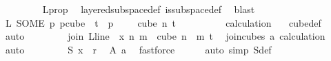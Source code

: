 \begin{isabellebody}
\ \ \ \ \ \ \ \isamarkupfalse%
\ L{\isacharunderscore}{\kern0pt}prop\ \isamarkupfalse%
\ layered{\isacharunderscore}{\kern0pt}subspace{\isacharunderscore}{\kern0pt}def\ is{\isacharunderscore}{\kern0pt}subspace{\isacharunderscore}{\kern0pt}def\ \isamarkupfalse%
\ blast\isanewline
\ \ \ \ \ \isamarkupfalse%
\ \isamarkupfalse%
\ {\isachardoublequoteopen}L\ {\isacharparenleft}{\kern0pt}SOME\ p{\isachardot}{\kern0pt}\ p{\isasymin}cube\ {}\ {\isacharparenleft}{\kern0pt}t{\isacharplus}{\kern0pt}{}{\isacharparenright}{\kern0pt}\ {\isasymand}\ p\ {}\ {\isacharequal}{\kern0pt}\ {}{\isacharparenright}{\kern0pt}\ {\isasymin}\ cube\ n\ {\isacharparenleft}{\kern0pt}t{\isacharplus}{\kern0pt}{}{\isacharparenright}{\kern0pt}{\isachardoublequoteclose}\ \isanewline
\ \ \ \ \ \ \ \isamarkupfalse%
\ calculation\ {\isacharparenleft}{\kern0pt}{}{\isacharcomma}{\kern0pt}{}{\isacharparenright}{\kern0pt}\ \isamarkupfalse%
\ cube{\isacharunderscore}{\kern0pt}def\ \isamarkupfalse%
\ auto\isanewline
\ \ \ \ \ \isamarkupfalse%
\ \isamarkupfalse%
\ {\isachardoublequoteopen}join\ {\isacharparenleft}{\kern0pt}L{\isacharunderscore}{\kern0pt}line\ {}{\isacharparenright}{\kern0pt}\ x\ n\ m\ {\isasymin}\ cube\ {\isacharparenleft}{\kern0pt}n\ {\isacharplus}{\kern0pt}\ m{\isacharparenright}{\kern0pt}\ {\isacharparenleft}{\kern0pt}t{\isacharplus}{\kern0pt}{}{\isacharparenright}{\kern0pt}{\isachardoublequoteclose}\ \isamarkupfalse%
\ join{\isacharunderscore}{\kern0pt}cubes\ a\ calculation{\isacharparenleft}{\kern0pt}{}{\isacharcomma}{\kern0pt}\ {}{\isacharparenright}{\kern0pt}\ \isamarkupfalse%
\ auto\isanewline
\ \ \ \ \ \isamarkupfalse%
\ \isamarkupfalse%
\ {\isachardoublequoteopen}{\isasymchi}S\ x\ {\isasymin}\ {\isacharbraceleft}{\kern0pt}{\isachardot}{\kern0pt}{\isachardot}{\kern0pt}{\isacharless}{\kern0pt}r{\isacharbraceright}{\kern0pt}{\isachardoublequoteclose}\ \isamarkupfalse%
\ A\ a\ \isamarkupfalse%
\ fastforce\isanewline
\ \ \ \ \isamarkupfalse%
\ {\isacharparenleft}{\kern0pt}auto\ simp{\isacharcolon}{\kern0pt}\ {\isasymchi}S{\isacharunderscore}{\kern0pt}def{\isacharparenright}{\kern0pt}%
\begin{isamarkuptext}%

\end{isamarkuptext}
\end{isabellebody}
